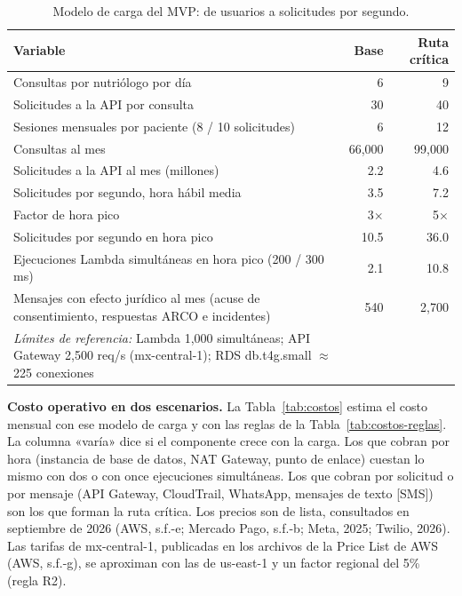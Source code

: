 \documentclass[12pt, a4paper]{article}
\begin{document}
\begin{table}[!htbp]
  \centering
  \caption{Modelo de carga del MVP: de usuarios a solicitudes por segundo.}
  \label{tab:carga}
  \footnotesize
  \begin{tabularx}{\textwidth}{X r r}
    \toprule
    \textbf{Variable} & \textbf{Base} & \textbf{Ruta crítica} \\
    \midrule
    Consultas por nutriólogo por día & 6 & 9 \\
    Solicitudes a la API por consulta & 30 & 40 \\
    Sesiones mensuales por paciente (8 / 10 solicitudes) & 6 & 12 \\
    Consultas al mes & 66,000 & 99,000 \\
    Solicitudes a la API al mes (millones) & 2.2 & 4.6 \\
    Solicitudes por segundo, hora hábil media & 3.5 & 7.2 \\
    Factor de hora pico & 3$\times$ & 5$\times$ \\
    Solicitudes por segundo en hora pico & 10.5 & 36.0 \\
    Ejecuciones Lambda simultáneas en hora pico (200 / 300 ms) & 2.1 & 10.8 \\
    Mensajes con efecto jurídico al mes (acuse de consentimiento, respuestas ARCO e incidentes) & 540 & 2,700 \\
    \midrule
    \textit{Límites de referencia:} Lambda 1,000 simultáneas; API Gateway 2,500 req/s (mx-central-1); RDS db.t4g.small $\approx$ 225 conexiones & & \\
    \bottomrule
  \end{tabularx}
\end{table}
 
\textbf{Costo operativo en dos escenarios.} La Tabla~\ref{tab:costos}
estima el costo mensual con ese modelo de carga y con las reglas de la
Tabla~\ref{tab:costos-reglas}. La columna «varía» dice si el componente
crece con la carga. Los que cobran por hora (instancia de base de datos,
NAT Gateway, punto de enlace) cuestan lo mismo con dos o con once
ejecuciones simultáneas. Los que cobran por solicitud o por mensaje (API
Gateway, CloudTrail, WhatsApp, mensajes de texto [SMS]) son los que
forman la ruta crítica. Los precios son de lista, consultados en
septiembre de 2026 (AWS, s.f.-e; Mercado Pago, s.f.-b; Meta, 2025;
Twilio, 2026). Las tarifas de mx-central-1, publicadas en los archivos
de la Price List de AWS (AWS, s.f.-g), se aproximan con las de us-east-1
y un factor regional del 5\% (regla R2).
 
\end{document}

